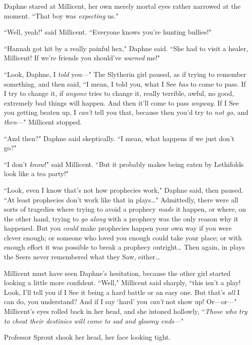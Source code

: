 Daphne stared at Millicent, her own merely mortal eyes rather narrowed at the moment. ``That boy was \emph{expecting} us."

``Well, yeah!" said Millicent. ``Everyone knows you're hunting bullies!"

``Hannah got hit by a really painful hex," Daphne said. ``She had to visit a healer, Millicent! If we're friends you should've \emph{warned} me!"

``Look, Daphne, I \emph{told} you—" The Slytherin girl paused, as if trying to remember something, and then said, ``I mean, I told you, what I See \emph{has} to come to pass. If I try to change it, if \emph{anyone} tries to change it, really terrible, awful, no good, extremely bad things will happen. And then it'll come to pass \emph{anyway}. If I See you getting beaten up, I \emph{can't} tell you that, because then you'd try to \emph{not go}, and \emph{then}—" Millicent stopped.

``And then?" Daphne said skeptically. ``I mean, what happens if we just don't go?"

``I don't \emph{know}!" said Millicent. ``But it probably makes being eaten by Lethifolds look like a tea party!"

``Look, even I know that's not how prophecies work," Daphne said, then paused. ``At least prophecies don't work like that in plays{\ldots}" Admittedly, there were all sorts of tragedies where trying to avoid a prophecy \emph{made} it happen, or where, on the other hand, trying to \emph{go along} with a prophecy was the only reason why it happened. But you \emph{could} make prophecies happen your own way if you were clever enough; or someone who loved you enough could take your place; or with enough effort it was possible to break a prophecy outright{\ldots} Then again, in plays the Seers never remembered what they Saw, either{\ldots}

Millicent must have seen Daphne's hesitation, because the other girl started looking a little more confident. ``Well," Millicent said sharply, ``this isn't a play! Look, I'll tell you if I See it being a hard battle or an easy one. But that's \emph{all} I can do, you understand? And if I say `hard' you \emph{can't} not show up! Or—or—" Millicent's eyes rolled back in her head, and she intoned hollowly, ``\emph{Those who try to cheat their destinies will come to sad and gloomy ends—}"

\later

Professor Sprout shook her head, her face looking tight.

